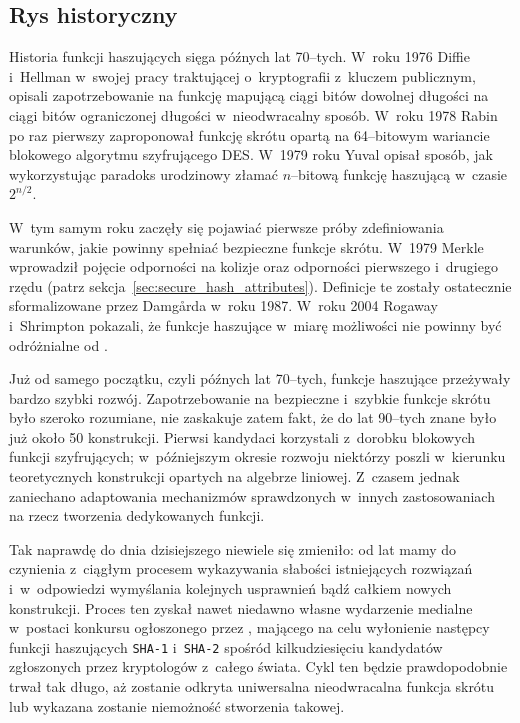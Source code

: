 \subsection{Rys historyczny}
Historia funkcji haszujących sięga późnych lat 70--tych. W~roku 1976 Diffie
i~Hellman w~swojej pracy traktującej o~kryptografii z~kluczem publicznym,
opisali zapotrzebowanie na funkcję mapującą ciągi bitów dowolnej długości na
ciągi bitów ograniczonej długości w~nieodwracalny sposób. W~roku 1978 Rabin po
raz pierwszy zaproponował funkcję skrótu opartą na 64--bitowym wariancie
blokowego algorytmu szyfrującego DES. W~1979 roku Yuval opisał sposób, jak
wykorzystując paradoks urodzinowy złamać $n$--bitową funkcję haszującą w~czasie
$2^{n/2}$.

W~tym samym roku zaczęły się pojawiać pierwsze próby zdefiniowania warunków,
jakie powinny spełniać bezpieczne funkcje skrótu. W~1979 Merkle wprowadził
pojęcie odporności na kolizje oraz odporności pierwszego i~drugiego rzędu
(patrz sekcja~\ref{sec:secure_hash_attributes}). Definicje te zostały
ostatecznie sformalizowane przez Damg\r{a}rda w~roku 1987. W~roku 2004 Rogaway
i~Shrimpton pokazali, że funkcje haszujące w~miarę możliwości nie powinny być
odróżnialne od .

Już od samego początku, czyli późnych lat 70--tych, funkcje haszujące
przeżywały bardzo szybki rozwój. Zapotrzebowanie na bezpieczne i~szybkie
funkcje skrótu było szeroko rozumiane, nie zaskakuje zatem fakt, że do lat
90--tych znane było już około 50 konstrukcji. Pierwsi kandydaci korzystali
z~dorobku blokowych funkcji szyfrujących; w~późniejszym okresie rozwoju
niektórzy poszli w~kierunku teoretycznych konstrukcji opartych na algebrze
liniowej. Z~czasem jednak zaniechano adaptowania mechanizmów sprawdzonych
w~innych zastosowaniach na rzecz tworzenia dedykowanych funkcji.

Tak naprawdę do dnia dzisiejszego niewiele się zmieniło: od lat mamy do
czynienia z~ciągłym procesem wykazywania słabości istniejących rozwiązań
i~w~odpowiedzi wymyślania kolejnych usprawnień bądź całkiem nowych konstrukcji.
Proces ten zyskał nawet niedawno własne wydarzenie medialne w~postaci konkursu
ogłoszonego przez , mającego
na celu wyłonienie następcy funkcji haszujących \texttt{SHA-1} i~\texttt{SHA-2}
spośród kilkudziesięciu kandydatów zgłoszonych przez kryptologów z~całego
świata. Cykl ten będzie prawdopodobnie trwał tak długo, aż zostanie odkryta
uniwersalna nieodwracalna funkcja skrótu lub wykazana zostanie niemożność
stworzenia takowej.
